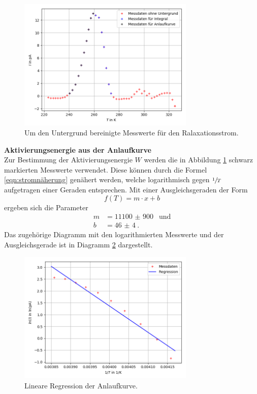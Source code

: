 \begin{figure}[H]
  \centering
  \includegraphics[width=0.75\textwidth]{Dipol1ohneUntergrund.png}
  \caption{Um den Untergrund bereinigte Messwerte für den Ralaxationsstrom.}
  \label{fig:Fig2}
\end{figure}

\newpage

\textbf{Aktivierungsenergie aus der Anlaufkurve}\\
Zur Bestimmung der Aktivierungsenergie $W$ werden die in Abbildung \ref{fig:Fig2} schwarz
markierten Messwerte verwendet. Diese können durch die Formel \ref{eqn:stromnäherung} genähert werden,
welche logarithmisch gegen $\sfrac{1}{T}$ aufgetragen einer Geraden entsprechen. Mit einer
Ausgleichsgeraden der Form
\begin{equation}
  f(T)=m\cdot x+b
\end{equation}
ergeben sich die Parameter
\begin{align*}
  m&=\SI{11100(900)}{}\;\; \text{und}\\
  b&=\SI{46(4)}{}.
\end{align*}
Das zugehörige Diagramm mit den logarithmierten Messwerte und der Ausgleichsgerade ist in Diagramm \ref{fig:Fig3}
dargestellt.

\begin{figure}[H]
  \centering
  \includegraphics[width=0.75\textwidth]{Dipol1Anlauf.png}
  \caption{Lineare Regression der Anlaufkurve.}
  \label{fig:Fig3}
\end{figure}

